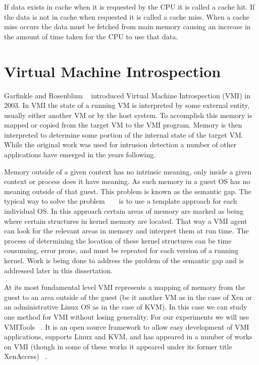 If data exists in cache when it is requested by the CPU it is called a cache hit. If the data is not in cache when requested it is called a cache miss.  When a cache miss occurs the data must be fetched from main memory causing an increase in the amount of time taken for the CPU to use that data. 



\section{Virtual Machine Introspection}

Garfinkle and Rosenblum ~\cite{garfinkel_virtual_2003} introduced Virtual Machine Introspection (VMI) in 2003. In VMI the state of a running VM is interpreted by some external entity, usually either another VM or by the host system. To accomplish this memory is mapped or copied from the target VM to the VMI program. Memory is then interpreted to determine some portion of the internal state of the target VM. While the original work was used for intrusion detection a number of other applications have emerged in the years following. 

Memory outside of a given context has no intrinsic meaning,  only inside a given context or process does it have meaning. As such memory in a guest OS has no meaning outside of that guest. This problem is known as the semantic gap. The typical way to solve the problem ~\cite{garfinkel_virtual_2003} ~\cite{hay_forensics_2008} is to use a template approach for each individual OS. In this approach certain areas of memory are marked as being where certain structures in kernel memory are located.  That way a VMI agent can look for the relevant areas in memory and interpret them at run time.  The process of determining the location of these kernel structures can be time consuming, error prone, and must be repeated for each version of a running kernel. Work is being done to address the problem of the semantic gap and is addressed later in this dissertation. 

At its most fundamental level VMI represents a mapping of memory from the guest to an area outside of the guest (be it another VM as in the case of Xen or an administrative Linux OS as in the case of KVM). In this case we can study one method for VMI without losing generality. For our experiments we will use VMITools ~\cite{payne_vmitools_2014}. It is an open source framework to allow easy development of VMI applications, supports Linux and KVM, and has appeared in a number of works on VMI (though in some of these works it appeared under its former title XenAccess) ~\cite{dolan-gavitt_leveraging_2011, zhao_vrfps:_2009, lengyel_virtual_2012, weingartner_promox:_2009, marken_using_2014}.

